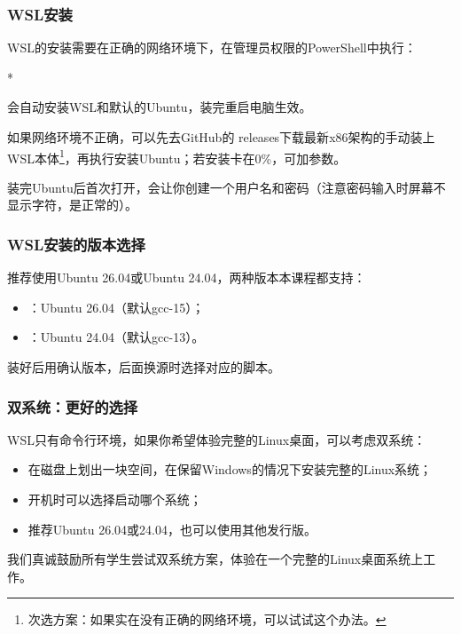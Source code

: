 \begin{frame}
    \frametitle{WSL安装}
    WSL的安装需要在\alert{正确的网络环境}下，在管理员权限的PowerShell中执行：
    \begin{Code}*
        
    \end{Code}
    会自动安装WSL和默认的Ubuntu，装完\alert{重启电脑}生效。

    如果网络环境不正确，可以先去GitHub的 releases下载最新\alert{x86}架构的手动装上WSL本体\footnote{次选方案：如果实在没有正确的网络环境，可以试试这个办法。}，再执行安装Ubuntu；若安装卡在0\%，可加参数。

    装完Ubuntu后首次打开，会让你创建一个用户名和密码（注意密码输入时屏幕不显示字符，是正常的）。
\end{frame}

\begin{frame}
    \frametitle{WSL安装的版本选择}
    推荐使用Ubuntu 26.04或Ubuntu 24.04，两种版本本课程都支持：
    \begin{itemize}
        \item {}：Ubuntu 26.04（默认gcc-15）；
        \item {}：Ubuntu 24.04（默认gcc-13）。
    \end{itemize}

    装好后用确认版本，后面换源时选择对应的脚本。
\end{frame}

\begin{frame}
    \frametitle{双系统：更好的选择}
    WSL只有命令行环境，如果你希望体验完整的Linux桌面，可以考虑\alert{双系统}：
    \begin{itemize}
        \item 在磁盘上划出一块空间，在保留Windows的情况下安装完整的Linux系统；
        \item 开机时可以选择启动哪个系统；
        \item 推荐Ubuntu 26.04或24.04，也可以使用其他发行版。
    \end{itemize}

    我们真诚鼓励所有学生尝试双系统方案，体验在一个完整的Linux桌面系统上工作。
\end{frame}

